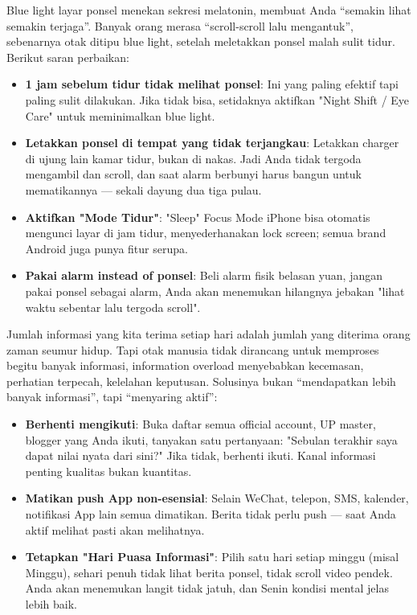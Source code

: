 
Blue light layar ponsel menekan sekresi melatonin, membuat Anda “semakin lihat semakin terjaga”. Banyak orang merasa “scroll-scroll lalu mengantuk”, sebenarnya otak ditipu blue light, setelah meletakkan ponsel malah sulit tidur. Berikut saran perbaikan:

\begin{itemize}
  \item \textbf{1 jam sebelum tidur tidak melihat ponsel}: Ini yang paling efektif tapi paling sulit dilakukan. Jika tidak bisa, setidaknya aktifkan "Night Shift / Eye Care" untuk meminimalkan blue light.
  \item \textbf{Letakkan ponsel di tempat yang tidak terjangkau}: Letakkan charger di ujung lain kamar tidur, bukan di nakas. Jadi Anda tidak tergoda mengambil dan scroll, dan saat alarm berbunyi harus bangun untuk mematikannya — sekali dayung dua tiga pulau.
  \item \textbf{Aktifkan "Mode Tidur"}: "Sleep" Focus Mode iPhone bisa otomatis mengunci layar di jam tidur, menyederhanakan lock screen; semua brand Android juga punya fitur serupa.
  \item \textbf{Pakai alarm instead of ponsel}: Beli alarm fisik belasan yuan, jangan pakai ponsel sebagai alarm, Anda akan menemukan hilangnya jebakan "lihat waktu sebentar lalu tergoda scroll".
\end{itemize}


Jumlah informasi yang kita terima setiap hari adalah jumlah yang diterima orang zaman seumur hidup. Tapi otak manusia tidak dirancang untuk memproses begitu banyak informasi, information overload menyebabkan kecemasan, perhatian terpecah, kelelahan keputusan. Solusinya bukan “mendapatkan lebih banyak informasi”, tapi “menyaring aktif”:

\begin{itemize}
  \item \textbf{Berhenti mengikuti}: Buka daftar semua official account, UP master, blogger yang Anda ikuti, tanyakan satu pertanyaan: "Sebulan terakhir saya dapat nilai nyata dari sini?" Jika tidak, berhenti ikuti. Kanal informasi penting kualitas bukan kuantitas.
  \item \textbf{Matikan push App non-esensial}: Selain WeChat, telepon, SMS, kalender, notifikasi App lain semua dimatikan. Berita tidak perlu push — saat Anda aktif melihat pasti akan melihatnya.
  \item \textbf{Tetapkan "Hari Puasa Informasi"}: Pilih satu hari setiap minggu (misal Minggu), sehari penuh tidak lihat berita ponsel, tidak scroll video pendek. Anda akan menemukan langit tidak jatuh, dan Senin kondisi mental jelas lebih baik.
\end{itemize}

